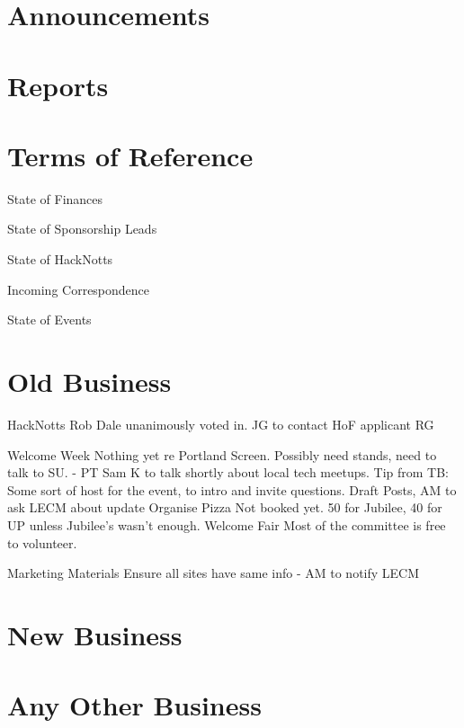 \documentclass[11pt,hacksoc,agenda]{meetingmins}
\begin{document}
\maketitle

\section{Announcements}
\begin{items}
\item
\end{items}

\section{Reports}

\section{Terms of Reference}
\begin{items}
\item {State of Finances}
\item {State of Sponsorship Leads}
\item {State of HackNotts}
\item {Incoming Correspondence}
\item {State of Events}
\end{items}

\section{Old Business}
\begin{items}
\item{HackNotts}
    \subsubitem Rob Dale unanimously voted in.
    \subsubitem JG to contact HoF applicant RG
\item{Welcome Week}
  \subitem Nothing yet re Portland Screen. Possibly need stands, need to talk to SU. - PT
  \subitem Sam K to talk shortly about local tech meetups. Tip from TB: Some sort of host for the event, to intro and invite questions.
  \subitem Draft Posts, AM to ask LECM about update
  \subitem Organise Pizza
    \subsubitem Not booked yet. 50 for Jubilee, 40 for UP unless Jubilee's wasn't enough.
  \subitem Welcome Fair
    \subsubitem Most of the committee is free to volunteer.  
\item{Marketing Materials}
  \subitem Ensure all sites have same info - AM to notify LECM
\end{items}

\section{New Business}
\begin{items}
\item{}
\end{items}

\section{Any Other Business}

\vspace{1em}
\end{document}
